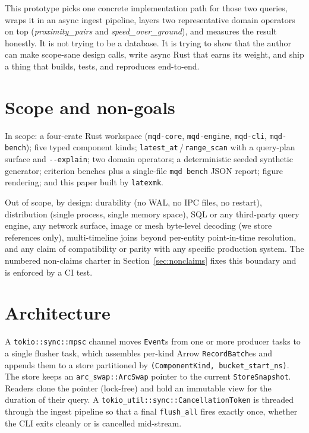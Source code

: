 \documentclass[11pt]{article}
\begin{document}
This prototype picks one concrete implementation path for those two queries, wraps it
in an async ingest pipeline, layers two representative domain operators on top
(\emph{proximity\_pairs} and \emph{speed\_over\_ground}), and measures the result
honestly. It is not trying to be a database. It is trying to show that the author can
make scope-sane design calls, write async Rust that earns its weight, and ship a thing
that builds, tests, and reproduces end-to-end.

\section{Scope and non-goals}
\label{sec:scope}

In scope: a four-crate Rust workspace (\texttt{mqd-core}, \texttt{mqd-engine},
\texttt{mqd-cli}, \texttt{mqd-bench}); five typed component kinds;
\texttt{latest\_at}\,/\,\texttt{range\_scan} with a query-plan surface and
\texttt{-{}-explain}; two domain operators; a deterministic seeded synthetic generator;
criterion benches plus a single-file \texttt{mqd bench} JSON report; figure rendering;
and this paper built by \texttt{latexmk}.

Out of scope, by design: durability (no WAL, no IPC files, no restart), distribution
(single process, single memory space), SQL or any third-party query engine, any network
surface, image or mesh byte-level decoding (we store references only), multi-timeline
joins beyond per-entity point-in-time resolution, and any claim of compatibility or
parity with any specific production system. The numbered non-claims charter in
Section~\ref{sec:nonclaims} fixes this boundary and is enforced by a CI test.

\section{Architecture}

A \texttt{tokio::sync::mpsc} channel moves \texttt{Event}s from one or more producer
tasks to a single flusher task, which assembles per-kind Arrow \texttt{RecordBatch}es
and appends them to a store partitioned by
\texttt{(ComponentKind, bucket\_start\_ns)}. The store keeps an
\texttt{arc\_swap::ArcSwap} pointer to the current \texttt{StoreSnapshot}. Readers
clone the pointer (lock-free) and hold an immutable view for the duration of their
query. A \texttt{tokio\_util::sync::CancellationToken} is threaded through the ingest
pipeline so that a final \texttt{flush\_all} fires exactly once, whether the CLI exits
cleanly or is cancelled mid-stream.
\end{document}
